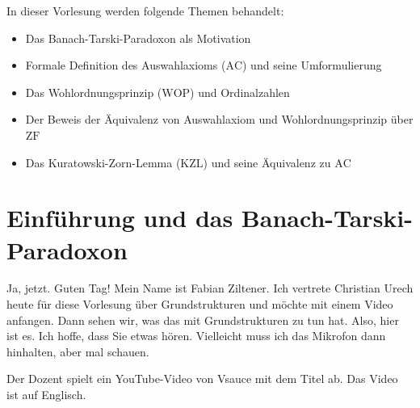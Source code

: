 


\begin{nice-box}
In dieser Vorlesung werden folgende Themen behandelt:
\begin{itemize}
    \item Das Banach-Tarski-Paradoxon als Motivation
    \item Formale Definition des Auswahlaxioms ($\text{AC}$) und seine Umformulierung
    \item Das Wohlordnungsprinzip ($\text{WOP}$) und Ordinalzahlen
    \item Der Beweis der Äquivalenz von Auswahlaxiom und Wohlordnungsprinzip über $\text{ZF}$
    \item Das Kuratowski-Zorn-Lemma ($\text{KZL}$) und seine Äquivalenz zu $\text{AC}$
\end{itemize}
\end{nice-box}

\section{Einführung und das Banach-Tarski-Paradoxon}

\begin{spoken-clean}[00:00:00 - 00:00:28]
Ja, jetzt. Guten Tag! Mein Name ist Fabian Ziltener. Ich vertrete Christian Urech heute für diese Vorlesung über Grundstrukturen und möchte mit einem Video anfangen. Dann sehen wir, was das mit Grundstrukturen zu tun hat. Also, hier ist es. Ich hoffe, dass Sie etwas hören. Vielleicht muss ich das Mikrofon dann hinhalten, aber mal schauen.
\end{spoken-clean}

\begin{meta-note}
Der Dozent spielt ein YouTube-Video von Vsauce mit dem Titel  ab. Das Video ist auf Englisch.
\end{meta-note}

